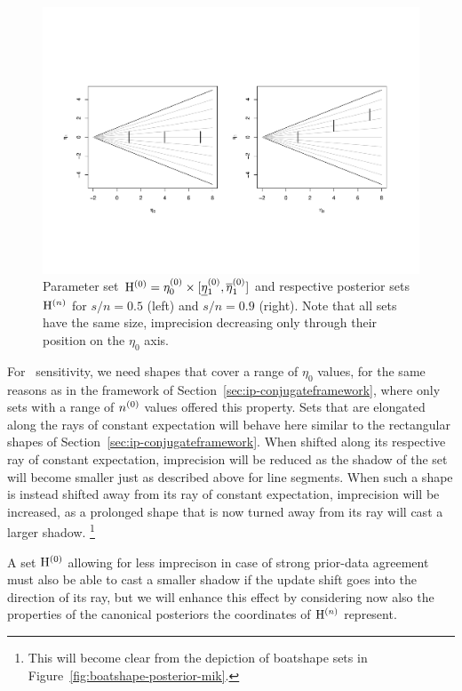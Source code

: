 \begin{figure}  %
\centering
\includegraphics[trim = 15mm 45mm 25mm 60mm, clip, width=\textwidth]{R/boatshape-vertical}%
\caption[Line segment parameter set $\EZ$ %
and respective posterior sets for $s/n=0.5$ and $s/n=0.9$.]%
{Parameter set $\mathrm{H}^{(0)} = \eta_0^{(0)} \times [\text{\underline{$\eta$}${}_1^{(0)}$},\overline{\eta}_1^{(0)}]$ and respective posterior sets $\mathrm{H}^{(n)}$
for $s/n=0.5$ (left) and $s/n=0.9$ (right). Note that all sets have the same size,
imprecision decreasing only through their position on the $\eta_0$ axis.}
\label{fig:boatshape-vertical}
\end{figure}

For \pdc\ sensitivity, we need shapes that cover a range of $\eta_0$ values,
for the same reasons as in the framework of Section~\ref{sec:ip-conjugateframework},
where only sets with a range of $n^{(0)}$ values offered this property.
Sets that are elongated along the rays of constant expectation
will behave here similar to the rectangular shapes of Section~\ref{sec:ip-conjugateframework}.
When shifted along its respective ray of constant expectation,
imprecision will be reduced as the shadow of the set will become smaller just as described above for line segments.
When such a shape is instead shifted away from its ray of constant expectation,
imprecision will be increased, as a prolonged shape that is now turned away from its ray 
will cast a larger shadow.%
\footnote{This will become clear from the depiction of boatshape sets in Figure~\ref{fig:boatshape-posterior-mik}.} 

A set $\EZ$ allowing for less imprecison in case of strong prior-data agreement
must also be able to cast a smaller shadow if the update shift goes into the direction of its ray,
but we will enhance this effect by considering now also the properties
of the canonical posteriors the coordinates of $\mathrm{H}^{(n)}$ represent.

